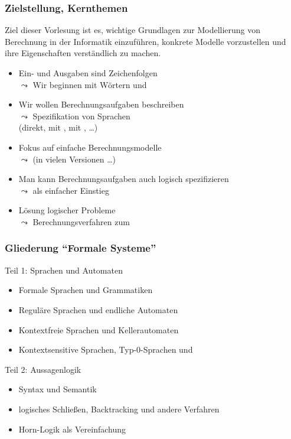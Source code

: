 \documentclass[aspectratio=1610,onlymath]{beamer}
\begin{document}
\begin{frame}\frametitle{Zielstellung, Kernthemen}

Ziel dieser Vorlesung ist es, wichtige Grundlagen zur \alert{Modellierung von Berechnung}
in der Informatik einzuführen, \alert{konkrete Modelle} vorzustellen und ihre \alert{Eigenschaften verständlich zu machen}.
\medskip

\begin{itemize}
\item Ein- und Ausgaben sind Zeichenfolgen\\
$\leadsto$ Wir beginnen mit Wörtern und 
%
\item Wir wollen Berechnungsaufgaben beschreiben\\
$\leadsto$ Spezifikation von Sprachen\\
\hspace{1em} (direkt, mit , mit , \ldots)
%
\item Fokus auf einfache Berechnungsmodelle\\
$\leadsto$  (in vielen Versionen \ldots)
%
\item Man kann Berechnungsaufgaben auch logisch spezifizieren\\
$\leadsto$  als einfacher Einstieg
%
\item Lösung logischer Probleme\\
$\leadsto$ Berechnungsverfahren zum 
\end{itemize}

\end{frame}


\begin{frame}\frametitle{Gliederung "`Formale Systeme"'}

\alert{Teil 1: Sprachen und Automaten}
\begin{itemize}
\item Formale Sprachen und Grammatiken
\item Reguläre Sprachen und endliche Automaten
\item Kontextfreie Sprachen und Kellerautomaten
\item Kontextsensitive Sprachen, Typ-0-Sprachen und 
\end{itemize}
\bigskip

\alert{Teil 2: Aussagenlogik}
\begin{itemize}
\item Syntax und Semantik
\item logisches Schließen, Backtracking und andere Verfahren
\item Horn-Logik als Vereinfachung
\end{itemize}

\end{frame}
\end{document}
